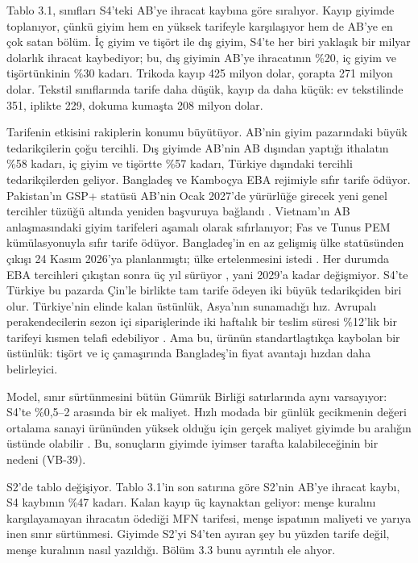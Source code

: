 Tablo 3.1, sınıfları S4'teki AB'ye ihracat kaybına göre sıralıyor. Kayıp giyimde toplanıyor, çünkü giyim hem en yüksek tarifeyle karşılaşıyor hem de AB'ye en çok satan bölüm. İç giyim ve tişört ile dış giyim, S4'te her biri yaklaşık bir milyar dolarlık ihracat kaybediyor; bu, dış giyimin AB'ye ihracatının \%20, iç giyim ve tişörtünkinin \%30 kadarı. Trikoda kayıp 425 milyon dolar, çorapta 271 milyon dolar. Tekstil sınıflarında tarife daha düşük, kayıp da daha küçük: ev tekstilinde 351, iplikte 229, dokuma kumaşta 208 milyon dolar.

Tarifenin etkisini rakiplerin konumu büyütüyor. AB'nin giyim pazarındaki büyük tedarikçilerin çoğu tercihli. Dış giyimde AB'nin AB dışından yaptığı ithalatın \%58 kadarı, iç giyim ve tişörtte \%57 kadarı, Türkiye dışındaki tercihli tedarikçilerden geliyor. Bangladeş ve Kamboçya EBA rejimiyle sıfır tarife ödüyor. Pakistan'ın GSP+ statüsü AB'nin Ocak 2027'de yürürlüğe girecek yeni genel tercihler tüzüğü altında yeniden başvuruya bağlandı \etiketD{}. Vietnam'ın AB anlaşmasındaki giyim tarifeleri aşamalı olarak sıfırlanıyor; Fas ve Tunus PEM kümülasyonuyla sıfır tarife ödüyor. Bangladeş'in en az gelişmiş ülke statüsünden çıkışı 24 Kasım 2026'ya planlanmıştı; ülke ertelenmesini istedi \etiketD{}. Her durumda EBA tercihleri çıkıştan sonra üç yıl sürüyor \etiketV{}, yani 2029'a kadar değişmiyor. S4'te Türkiye bu pazarda Çin'le birlikte tam tarife ödeyen iki büyük tedarikçiden biri olur. Türkiye'nin elinde kalan üstünlük, Asya'nın sunamadığı hız. Avrupalı perakendecilerin sezon içi siparişlerinde iki haftalık bir teslim süresi \%12'lik bir tarifeyi kısmen telafi edebiliyor \etiketH{}. Ama bu, ürünün standartlaştıkça kaybolan bir üstünlük: tişört ve iç çamaşırında Bangladeş'in fiyat avantajı hızdan daha belirleyici.

Model, sınır sürtünmesini bütün Gümrük Birliği satırlarında aynı varsayıyor: S4'te \%0,5--2 arasında bir ek maliyet. Hızlı modada bir günlük gecikmenin değeri ortalama sanayi ürününden yüksek olduğu için gerçek maliyet giyimde bu aralığın üstünde olabilir \etiketH{}. Bu, sonuçların giyimde iyimser tarafta kalabileceğinin bir nedeni (VB-39).

S2'de tablo değişiyor. Tablo 3.1'in son satırına göre S2'nin AB'ye ihracat kaybı, S4 kaybının \%47 kadarı. Kalan kayıp üç kaynaktan geliyor: menşe kuralını karşılayamayan ihracatın ödediği MFN tarifesi, menşe ispatının maliyeti ve yarıya inen sınır sürtünmesi. Giyimde S2'yi S4'ten ayıran şey bu yüzden tarife değil, menşe kuralının nasıl yazıldığı. Bölüm 3.3 bunu ayrıntılı ele alıyor.

